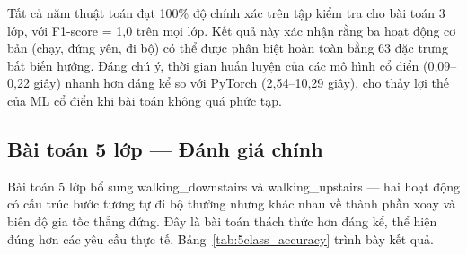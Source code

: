 Tất cả năm thuật toán đạt 100\% độ chính xác trên tập kiểm tra cho bài toán 3 lớp, với F1-score = 1,0 trên mọi lớp. Kết quả này xác nhận rằng ba hoạt động cơ bản (chạy, đứng yên, đi bộ) có thể được phân biệt hoàn toàn bằng 63 đặc trưng bất biến hướng. Đáng chú ý, thời gian huấn luyện của các mô hình cổ điển (0,09--0,22 giây) nhanh hơn đáng kể so với PyTorch (2,54--10,29 giây), cho thấy lợi thế của ML cổ điển khi bài toán không quá phức tạp.

\subsection{Bài toán 5 lớp --- Đánh giá chính}
\label{sec:five_class}

Bài toán 5 lớp bổ sung walking\_downstairs và walking\_upstairs --- hai hoạt động có cấu trúc bước tương tự đi bộ thường nhưng khác nhau về thành phần xoay và biên độ gia tốc thẳng đứng. Đây là bài toán thách thức hơn đáng kể, thể hiện đúng hơn các yêu cầu thực tế. Bảng~\ref{tab:5class_accuracy} trình bày kết quả.

\begin{table}[H]
    \centering
    \caption{Kết quả huấn luyện --- bài toán 5 lớp (63 đặc trưng orientation-invariant, tập kiểm tra 229 mẫu)}
    \label{tab:5class_accuracy}
\end{table}


